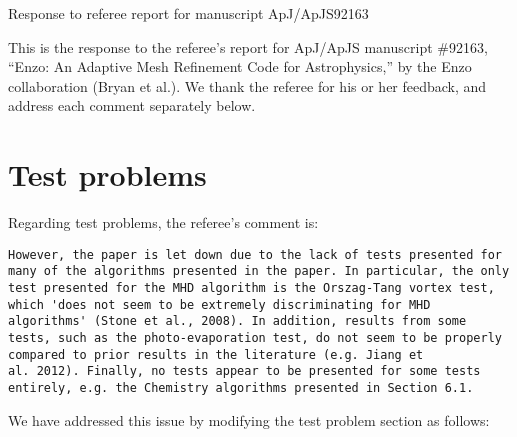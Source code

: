 \documentclass[11pt]{article}
\begin{document}
\begin{center} 
\bfseries{
\begin{large}
Response to referee report for manuscript  ApJ/ApJS92163
\end{large}
}
\end{center}



This is the response to the referee's report for ApJ/ApJS manuscript
\#92163, ``Enzo: An Adaptive Mesh Refinement Code for Astrophysics,''
by the Enzo collaboration (Bryan et al.).  We thank the referee for
his or her feedback, and address each comment separately below.

\section{Test problems}

Regarding test problems, the referee's comment is:

\begin{verbatim}
However, the paper is let down due to the lack of tests presented for
many of the algorithms presented in the paper. In particular, the only
test presented for the MHD algorithm is the Orszag-Tang vortex test,
which 'does not seem to be extremely discriminating for MHD
algorithms' (Stone et al., 2008). In addition, results from some
tests, such as the photo-evaporation test, do not seem to be properly
compared to prior results in the literature (e.g. Jiang et
al. 2012). Finally, no tests appear to be presented for some tests
entirely, e.g. the Chemistry algorithms presented in Section 6.1.
\end{verbatim}

We have addressed this issue by modifying the test problem section as follows:
\end{document}
